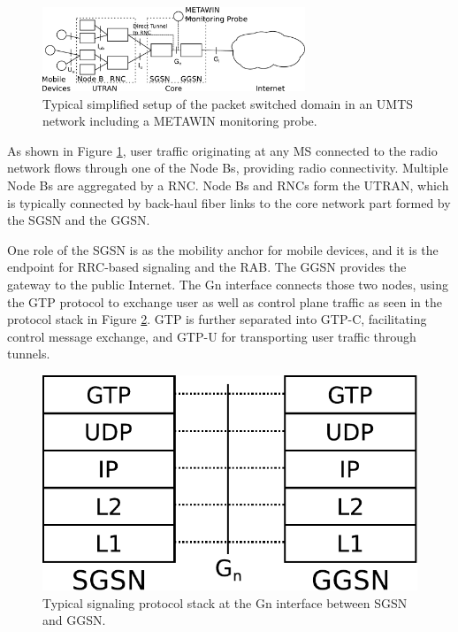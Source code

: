 \begin{figure}
\centering
\includegraphics[width=0.7\textwidth]{images/umts-network.pdf}
\caption{Typical simplified setup of the packet switched domain in an \acs{UMTS} network including a METAWIN monitoring probe.}
\label{fig:umtsnetwork-CONEXT}
\end{figure}



As shown in Figure \ref{fig:umtsnetwork-CONEXT}, user traffic originating at any \ac{MS} connected to the radio network flows through one of the Node Bs, providing radio connectivity. Multiple Node Bs are aggregated by a \ac{RNC}. Node Bs and \acp{RNC} form the \ac{UTRAN}, which is typically connected by back-haul fiber links to the core network part formed by the \ac{SGSN} and the \ac{GGSN}.

One role of the \ac{SGSN} is as the mobility anchor for mobile devices, and it is the endpoint for \ac{RRC}-based signaling and the \ac{RAB}. The \ac{GGSN} provides the gateway to the public Internet. The Gn interface connects those two nodes, using the \ac{GTP} protocol to exchange user as well as control plane traffic as seen in the protocol stack in Figure \ref{fig:signallingstack-CONEXT}. \ac{GTP} is further separated into GTP-C, facilitating control message exchange, and GTP-U for transporting user traffic through tunnels.


\begin{figure}
\centering
\includegraphics[width=0.6\columnwidth]{images/signalling-stack.pdf}
\caption{Typical signaling protocol stack at the Gn interface between \ac{SGSN} and \ac{GGSN}.}
\label{fig:signallingstack-CONEXT}
\end{figure}




